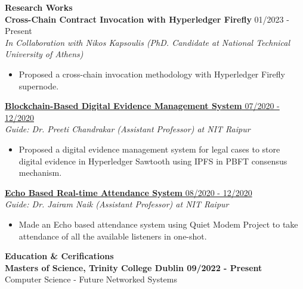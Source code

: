 \documentclass{article}
\begin{document}
\noindent \large \textbf{\textcolor{NavyBlue}{Research Works}} \vspace{5pt} \\
\noindent \normalsize \textbf{Cross-Chain Contract Invocation with Hyperledger Firefly} \hfill 01/2023 - Present \\
\textit{In Collaboration with Nikos Kapsoulis (PhD. Candidate at National Technical University of Athens)} \hfill
\begin{itemize}
    \item Proposed a cross-chain invocation methodology with Hyperledger Firefly supernode.
\end{itemize}
\noindent \normalsize \href{https://link.springer.com/content/pdf/10.1007/978-3-030-82469-3_30}{\textbf{Blockchain-Based Digital Evidence Management System } \hfill 07/2020 - 12/2020} \\
\textit{Guide: Dr. Preeti Chandrakar (Assistant Professor) at NIT Raipur} \hfill
\begin{itemize}
    \item Proposed a digital evidence management system for legal cases to store digital evidence in Hyperledger Sawtooth using IPFS in PBFT consensus mechanism.
\end{itemize}

\noindent \normalsize \href{https://dx.doi.org/10.1504/ijiids.2022.10044370}{\textbf{Echo Based Real-time Attendance System} \hfill 08/2020 - 12/2020} \\
\textit{Guide: Dr. Jairam Naik (Assistant Professor) at NIT Raipur}
\begin{itemize}
    \item  Made an Echo based attendance system using Quiet Modem Project to take attendance of all
the available listeners in one-shot.
\end{itemize}
\noindent \large \textbf{\textcolor{NavyBlue}{Education \& Cerifications}} \vspace{5pt} \\
\normalsize \textbf{Masters of Science, Trinity College Dublin \hfill 09/2022 - Present}\\
Computer Science - Future Networked Systems
\vspace{5pt}
\end{document}
